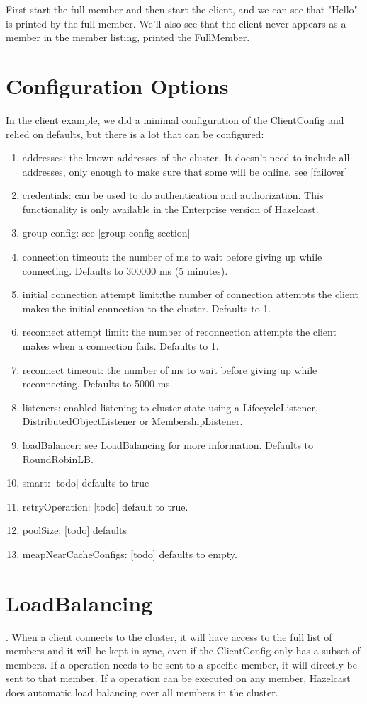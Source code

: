 First start the full member and then start the client, and we can see that "Hello" is printed by the full member. We'll also see that the client never appears as a member in the member listing, printed the FullMember.

\section{Configuration Options}
In the client example, we did a minimal configuration of the ClientConfig and relied on defaults, but there is a lot that can be configured:
\begin{enumerate}
\item addresses: the known addresses of the cluster. It doesn't need to include all addresses, only enough to make sure that some will be online. see [failover]
\item credentials: can be used to do authentication and authorization. This functionality is only available in the Enterprise version of Hazelcast.
\item group config: see [group config section]
\item connection timeout: the number of ms to wait before giving up while connecting. Defaults to 300000 ms (5 minutes).
\item initial connection attempt limit:the  number of connection attempts the client makes the initial connection to the cluster. Defaults to 1.
\item reconnect attempt limit: the number of reconnection attempts the client makes when a connection fails. Defaults to 1.
\item reconnect timeout: the number of ms to wait before giving up while reconnecting. Defaults to 5000 ms.
\item listeners: enabled listening to cluster state using a LifecycleListener, DistributedObjectListener or MembershipListener.
\item loadBalancer: see LoadBalancing for more information. Defaults to RoundRobinLB.
\item smart: [todo] defaults to true
\item retryOperation: [todo] default to true.
\item poolSize: [todo] defaults
\item meapNearCacheConfigs: [todo] defaults to empty.
\end{enumerate}

\section{LoadBalancing}.
When a client connects to the cluster, it will have access to the full list of members and it will be kept in sync, even if the ClientConfig only has a subset of members. If a operation needs to be sent to a specific member, it will directly be sent to that member. If a operation can be executed on any member, Hazelcast does automatic load balancing over all members in the cluster. 

